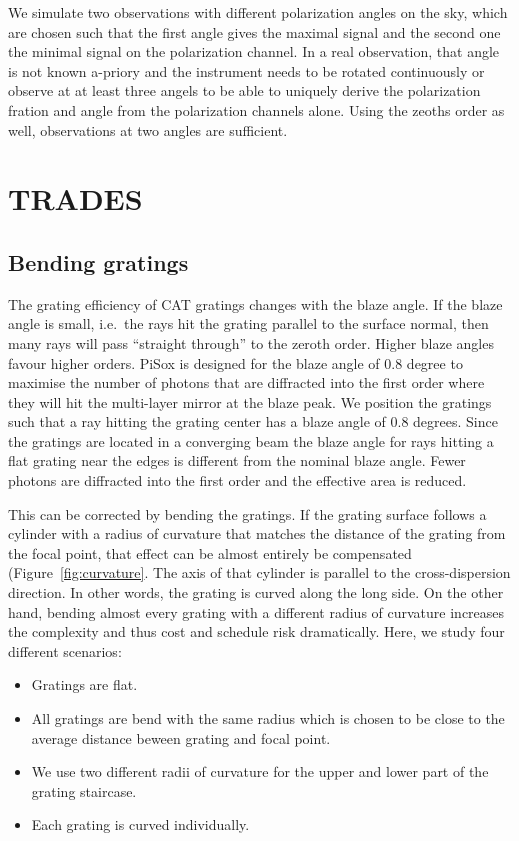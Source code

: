 \documentclass[]{spie}  %
\begin{document}
We simulate two observations with different polarization angles on the sky, which are chosen such that the first angle gives the maximal signal and the second one the minimal signal on the polarization channel. In a real observation, that angle is not known a-priory and the instrument needs to be rotated continuously or observe at at least three angels to be able to uniquely derive the polarization fration and angle from the polarization channels alone. Using the zeoths order as well, observations at two angles are sufficient.

\section{TRADES}
\label{sect:trades}

\subsection{Bending gratings}
The grating efficiency of CAT gratings changes with the blaze angle. If the blaze angle is small, i.e.\ the rays hit the grating parallel to the surface normal, then many rays will pass ``straight through'' to the zeroth order. Higher blaze angles favour higher orders. PiSox is designed for the blaze angle of 0.8 degree to maximise the number of photons that are diffracted into the first order where they will hit the multi-layer mirror at the blaze peak. We position the gratings such that a ray hitting the grating center has a blaze angle of 0.8 degrees. Since the gratings are located in a converging beam the blaze angle for rays hitting a flat grating near the edges is different from the nominal blaze angle. Fewer photons are diffracted into the first order and the effective area is reduced.

This can be corrected by bending the gratings. If the grating surface follows a cylinder with a radius of curvature that matches the distance of the grating from the focal point, that effect can be almost entirely be compensated (Figure~\ref{fig:curvature}. The axis of that cylinder is parallel to the cross-dispersion direction. In other words, the grating is curved along the long side. On the other hand, bending almost every grating with a different radius of curvature increases the complexity and thus cost and schedule risk dramatically. Here, we study four different scenarios:
\begin{itemize}
    \item Gratings are flat.
    \item All gratings are bend with the same radius which is chosen to be close to the average distance beween grating and focal point.
    \item We use two different radii of curvature for the upper and lower part of the grating staircase.
    \item Each grating is curved individually.
\end{itemize}
\end{document}

